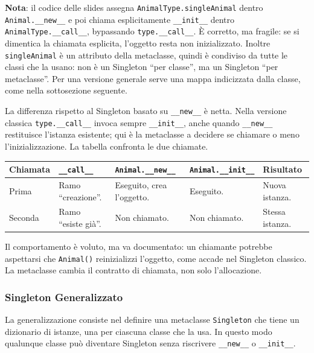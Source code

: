 \documentclass[12pt]{extarticle}
\begin{document}
\noindent \textbf{Nota}: il codice delle slides assegna \texttt{AnimalType.singleAnimal} dentro \texttt{Animal.\_\_new\_\_} e poi chiama esplicitamente \texttt{\_\_init\_\_} dentro \texttt{AnimalType.\_\_call\_\_}, bypassando \texttt{type.\_\_call\_\_}. È corretto, ma fragile: se si dimentica la chiamata esplicita, l'oggetto resta non inizializzato. Inoltre \texttt{singleAnimal} è un attributo della metaclasse, quindi è condiviso da tutte le classi che la usano: non è un Singleton ``per classe'', ma un Singleton ``per metaclasse''. Per una versione generale serve una mappa indicizzata dalla classe, come nella sottosezione seguente.

{\sloppy
\noindent La differenza rispetto al Singleton basato su \texttt{\_\_new\_\_} è netta. Nella versione classica \texttt{type.\_\_call\_\_} invoca sempre \texttt{\_\_init\_\_}, anche quando \texttt{\_\_new\_\_} restituisce l'istanza esistente; qui è la metaclasse a decidere se chiamare o meno l'inizializzazione. La tabella confronta le due chiamate.

\begin{center}
\small
\begin{tabular}{p{2.8cm}p{3.6cm}p{3.2cm}p{3.0cm}p{2.4cm}}
    \toprule
    \textbf{Chiamata} & \texttt{\_\_call\_\_} & \texttt{Animal.\_\_new\_\_} & \texttt{Animal.\_\_init\_\_} & \textbf{Risultato} \\
    \midrule
    Prima & Ramo ``creazione''. & Eseguito, crea l'oggetto. & Eseguito. & Nuova istanza. \\
    \addlinespace
    Seconda & Ramo ``esiste già''. & Non chiamato. & Non chiamato. & Stessa istanza. \\
    \bottomrule
\end{tabular}
\end{center}

\noindent Il comportamento è voluto, ma va documentato: un chiamante potrebbe aspettarsi che \texttt{Animal()} reinizializzi l'oggetto, come accade nel Singleton classico. La metaclasse cambia il contratto di chiamata, non solo l'allocazione.\par}

\subsubsection{Singleton Generalizzato}

\noindent La generalizzazione consiste nel definire una metaclasse \texttt{Singleton} che tiene un dizionario di istanze, una per ciascuna classe che la usa. In questo modo qualunque classe può diventare Singleton senza riscrivere \texttt{\_\_new\_\_} o \texttt{\_\_init\_\_}.
\end{document}
